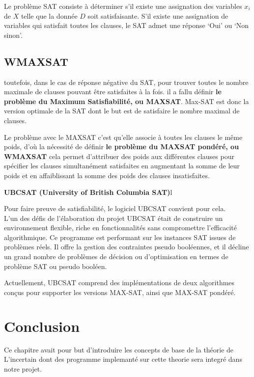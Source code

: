 Le problème SAT consiste à déterminer s’il existe une assignation des variables $x_i$ de $X$ telle que la donnée $D$ soit satisfaisante. S’il existe une assignation de variables qui satisfait toutes les clauses, le SAT admet une réponse ‘Oui’ ou ‘Non sinon’.\cite{hkhallafiThesis}
\subsection{WMAXSAT}

toutefois, dans le cas de réponse négative du SAT, pour trouver toutes le nombre maximale de clauses pouvant être satisfaites à la fois. il a fallu définir \textbf{le problème du Maximum Satisfiabilité, ou MAXSAT}. Max-SAT est donc la version optimale de la SAT dont le but est de satisfaire le nombre maximal de clauses.

Le problème avec le MAXSAT c’est qu’elle associe à toutes les clauses le même poids, d’où la nécessité de définir \textbf{le problème du MAXSAT pondéré, ou WMAXSAT} cela permet d'attribuer des poids aux différentes clauses pour spécifier les clauses simultanément satisfaites en augmentant la somme de leur poids et en affaiblissant la somme des poids des clauses insatisfaites. \cite{hkhallafiThesis}


\textbf{UBCSAT (University of British Columbia SAT)}l

Pour faire preuve de satisfiabilité, le logiciel UBCSAT convient pour cela.\\
L'un des défis de l'élaboration du projet UBCSAT était de construire un environnement flexible, riche en fonctionnalités sans compromettre l'efficacité algorithmique. Ce programme est performant sur les instances SAT issues de problèmes réels. Il offre la gestion des contraintes pseudo booléennes, et il décline un grand nombre de problèmes de décision ou d’optimisation en termes de problème SAT ou pseudo booléen.    \cite{hassenThesis}

Actuellement, UBCSAT comprend des implémentations de deux algorithmes conçus pour supporter les versions MAX-SAT, ainsi que MAX-SAT pondéré.

{}
\section*{Conclusion}
Ce chapitre avait pour but d'introduire les concepts de base de la théorie de
L’incertain dont des programme implemanté sur cette theorie sera integré dans notre projet. 